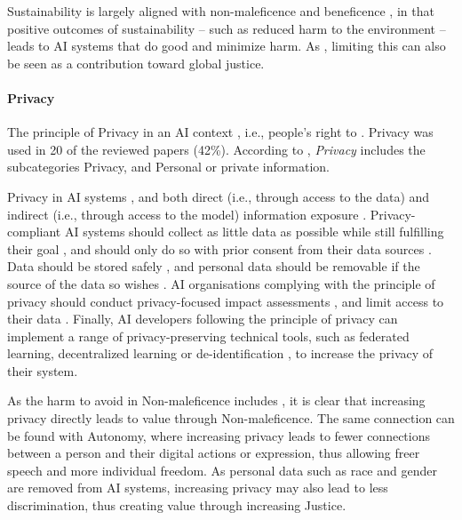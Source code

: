Sustainability is largely aligned with non-maleficence and beneficence \parencite{Peters_2020}, in that positive outcomes of sustainability -- such as reduced harm to the environment -- leads to AI systems that do good and minimize harm. As  \parencite[p.~IX]{OECD_climate_change}, limiting this can also be seen as a contribution toward global justice.


\paragraph{Privacy}
The principle of Privacy in an AI context  \parencite[p.~6]{Doorn_2021}, i.e., people's right to  \parencite{dictionary_privacy}. Privacy was used in 20 of the reviewed papers (42\%). According to \textcite{Ryan_2021}, \textit{Privacy} includes the subcategories Privacy, and Personal or private information.

Privacy in AI systems  \parencite[p.~106]{BarredoArrieta_2020}, and both direct (i.e., through access to the data) and indirect (i.e., through access to the model) information exposure \parencite[p.~1155]{Cheng_2021}. Privacy-compliant AI systems should collect as little data as possible while still fulfilling their goal \parencite{Doorn_2021,Havrda_2020,Ryan_2021}, and should only do so with prior consent from their data sources \parencite{Fjeld_2020,Rothenberger_2019}. Data should be stored safely \parencite{Liu_2021}, and personal data should be removable if the source of the data so wishes \parencite{Fjeld_2020,Ryan_2021}. AI organisations complying with the principle of privacy should conduct privacy-focused impact assessments \parencite{Havrda_2020}, and limit access to their data \parencite{Jobin_2019}. Finally, AI developers following the principle of privacy can implement a range of privacy-preserving technical tools, such as federated learning, decentralized learning \parencite{Lu_2022} or de-identification \parencite{Ryan_2021}, to increase the privacy of their system.

As the harm to avoid in Non-maleficence includes  \parencite[p.~9]{Jobin_2019}, it is clear that increasing privacy directly leads to value through Non-maleficence. The same connection can be found with Autonomy, where increasing privacy leads to fewer connections between a person and their digital actions or expression, thus allowing freer speech and more individual freedom. As personal data such as race and gender are removed from AI systems, increasing privacy may also lead to less discrimination, thus creating value through increasing Justice.


